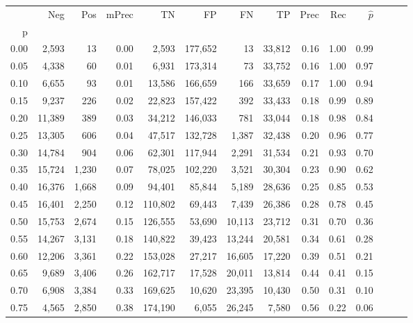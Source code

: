\begin{tabular}{rrrrrrrrrrrrrr}
\toprule
{} &     Neg &    Pos & mPrec &       TN &       FP &      FN &      TP &  Prec &   Rec & $\hat{p}$ \\
p    &         &        &       &          &          &         &         &       &       &           \\
\midrule
0.00 &   2,593 &     13 &  0.00 &    2,593 &  177,652 &      13 &  33,812 &  0.16 &  1.00 &      0.99 \\
0.05 &   4,338 &     60 &  0.01 &    6,931 &  173,314 &      73 &  33,752 &  0.16 &  1.00 &      0.97 \\
0.10 &   6,655 &     93 &  0.01 &   13,586 &  166,659 &     166 &  33,659 &  0.17 &  1.00 &      0.94 \\
0.15 &   9,237 &    226 &  0.02 &   22,823 &  157,422 &     392 &  33,433 &  0.18 &  0.99 &      0.89 \\
0.20 &  11,389 &    389 &  0.03 &   34,212 &  146,033 &     781 &  33,044 &  0.18 &  0.98 &      0.84 \\
0.25 &  13,305 &    606 &  0.04 &   47,517 &  132,728 &   1,387 &  32,438 &  0.20 &  0.96 &      0.77 \\
0.30 &  14,784 &    904 &  0.06 &   62,301 &  117,944 &   2,291 &  31,534 &  0.21 &  0.93 &      0.70 \\
0.35 &  15,724 &  1,230 &  0.07 &   78,025 &  102,220 &   3,521 &  30,304 &  0.23 &  0.90 &      0.62 \\
0.40 &  16,376 &  1,668 &  0.09 &   94,401 &   85,844 &   5,189 &  28,636 &  0.25 &  0.85 &      0.53 \\
0.45 &  16,401 &  2,250 &  0.12 &  110,802 &   69,443 &   7,439 &  26,386 &  0.28 &  0.78 &      0.45 \\
0.50 &  15,753 &  2,674 &  0.15 &  126,555 &   53,690 &  10,113 &  23,712 &  0.31 &  0.70 &      0.36 \\
0.55 &  14,267 &  3,131 &  0.18 &  140,822 &   39,423 &  13,244 &  20,581 &  0.34 &  0.61 &      0.28 \\
0.60 &  12,206 &  3,361 &  0.22 &  153,028 &   27,217 &  16,605 &  17,220 &  0.39 &  0.51 &      0.21 \\
0.65 &   9,689 &  3,406 &  0.26 &  162,717 &   17,528 &  20,011 &  13,814 &  0.44 &  0.41 &      0.15 \\
0.70 &   6,908 &  3,384 &  0.33 &  169,625 &   10,620 &  23,395 &  10,430 &  0.50 &  0.31 &      0.10 \\
0.75 &   4,565 &  2,850 &  0.38 &  174,190 &    6,055 &  26,245 &   7,580 &  0.56 &  0.22 &      0.06 \\

\end{tabular}
